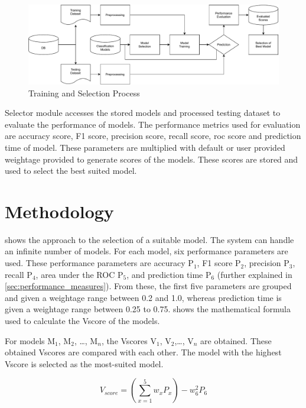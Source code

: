 \begin{figure}[H]
  \centering
  \includegraphics[width=0.9\columnwidth]{media/architecture/Process.pdf}
  \caption{Training and Selection Process}
  \label{fig:training_and_selection_process}
\end{figure}

Selector module accesses the stored models and processed testing dataset to evaluate the performance of models. The performance metrics used for evaluation are accuracy score, F1 score, precision score, recall score, roc score and prediction time of model. These parameters are multiplied with default or user provided weightage provided to generate scores of the models. These scores are stored and used to select the best suited model.

\section{Methodology}\label{sec:methodology}

 shows the approach to the selection of a suitable model. The system can handle an infinite number of models. For each model, six performance parameters are used. These performance parameters are accuracy P$_1$, F1 score P$_2$, precision P$_3$, recall P$_4$, area under the ROC P$_5$, and prediction time P$_6$ (further explained in \cref{sec:performance_measures}). From these, the first five parameters are grouped and given a weightage range between 0.2 and 1.0, whereas prediction time is given a weightage range between 0.25 to 0.75.  shows the mathematical formula used to calculate the Vscore of the models.

For models M$_1$, M$_2$, \ldots, M$_n$, the Vscores V$_1$, V$_2$,\ldots, V$_n$ are obtained. These obtained Vscores are compared with each other. The model with the highest Vscore is selected as the most-suited model.

\begin{equation}\label{eq:v_score}
  V_{score} = \left(\sum_{x=1}^{5} w_xP_x\right) - w_6^2P_6
\end{equation}


